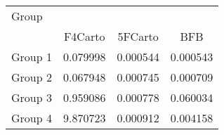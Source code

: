 \begin{tabular}{lccc}
\toprule
Group &  \\
\cmidrule(lr){2-4}
     & F4Carto & 5FCarto & BFB \\
\midrule

Group 1 & 0.079998 & 0.000544 & 0.000543 \\
Group 2 & 0.067948 & 0.000745 & 0.000709 \\
Group 3 & 0.959086 & 0.000778 & 0.060034 \\
Group 4 & 9.870723 & 0.000912 & 0.004158 \\
\bottomrule
\end{tabular}
